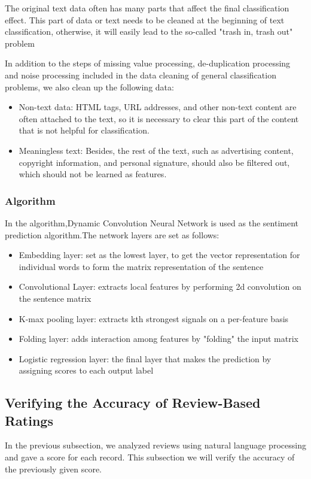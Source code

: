 \documentclass{mcmthesis}
\begin{document}
	
	The original text data often has many parts that affect the final classification effect. This part of data or text needs to be cleaned at the beginning of text classification, otherwise, it will easily lead to the so-called "trash in, trash out" problem\cite{2}
	
	In addition to the steps of missing value processing, de-duplication processing and noise processing included in the data cleaning of general classification problems, we also clean up the following data:
	\begin{itemize}
		\item Non-text data: HTML tags, URL addresses, and other non-text content are often attached to the text, so it is necessary to clear this part of the content that is not helpful for classification.
		\item Meaningless text: Besides, the rest of the text, such as advertising content, copyright information, and personal signature, should also be filtered out, which should not be learned as features.
	\end{itemize}
	\subsubsection{Algorithm}
	In the algorithm,Dynamic Convolution Neural Network is used as the sentiment prediction algorithm.The network layers are set as follows:
	\begin{itemize}
		\item Embedding layer: set as the lowest layer, to get the vector representation for individual words to form the matrix representation of the sentence
		\item Convolutional Layer: extracts local features by performing 2d convolution on the sentence matrix
		\item K-max pooling layer: extracts kth strongest signals on a per-feature basis
		\item Folding layer: adds interaction among features by "folding" the input matrix
		\item Logistic regression layer: the final layer that makes the prediction by assigning scores to each output label
	\end{itemize}
	
	
	\subsection{Verifying the Accuracy of Review-Based Ratings}
	In the previous subsection, we analyzed reviews using natural language processing and gave a score for each record. This subsection we will verify the accuracy of the previously given score.
	
\end{document}
